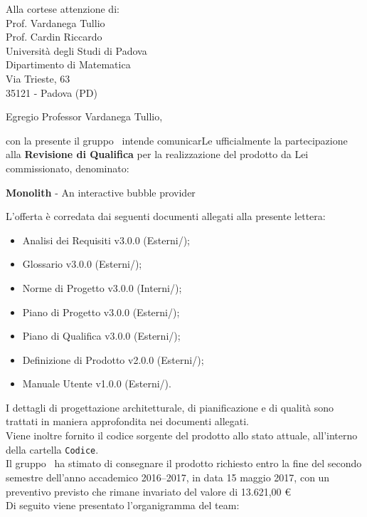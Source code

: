 

\newcommand{\logo}{../../Template/Logo/Logo.png}
\newcommand{\data}{\today}
\newcommand{\oggetto}{Partecipazione alla Revisione di Qualifica.}
\newcommand{\mittente}{Francesco Bazzerla \\ Responsabile NPE Developers}
\newcommand{\firma}{../../Template/Firme/FB.png}





\begin{letter}{Alla cortese attenzione di:  \\
 Prof. Vardanega Tullio \\
 Prof. Cardin Riccardo \\
 Università degli Studi di Padova \\
 Dipartimento di Matematica \\
 Via Trieste, 63 \\
 35121 - Padova (PD)}

\opening{Egregio Professor Vardanega Tullio,} 

con la presente il gruppo \gruppo\ intende comunicarLe ufficialmente la partecipazione alla \textbf{Revisione di Qualifica} per la realizzazione del prodotto da Lei commissionato, denominato:
\begin{center}
\textbf{Monolith} - An interactive bubble provider
\end{center}
L'offerta è corredata dai seguenti documenti allegati alla presente lettera:
\begin{itemize}
	\item Analisi dei Requisiti v3.0.0 (Esterni/\analisiDeiRequisiti);
	\item Glossario v3.0.0 (Esterni/\glossario);
	\item Norme di Progetto v3.0.0 (Interni/\normeDiProgetto);
	\item Piano di Progetto v3.0.0 (Esterni/\pianoDiProgetto);
	\item Piano di Qualifica v3.0.0 (Esterni/\pianoDiQualifica);
	\item Definizione di Prodotto v2.0.0 (Esterni/);
	\item Manuale Utente v1.0.0 (Esterni/\manualeUtente).
\end{itemize}

I dettagli di progettazione architetturale, di pianificazione e di qualità sono trattati in maniera approfondita nei documenti allegati. \\
Viene inoltre fornito il codice sorgente del prodotto allo stato attuale, all'interno della cartella \texttt{Codice}. \\
Il gruppo \gruppo\ ha stimato di consegnare il prodotto richiesto entro la fine del secondo semestre
dell'anno accademico 2016–2017, in data 15 maggio 2017, con un preventivo previsto che rimane invariato del valore di 13.621,00 \euro \\
Di seguito viene presentato l'organigramma del team:


\end{letter}
